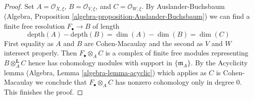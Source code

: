 \documentclass[10pt,a4paper]{amsart}
\theoremstyle{plain}
\theoremstyle{definition}
\theoremstyle{remark}
\numberwithin{equation}{subsection}
\begin{document}
\begin{proof}
Set $A = \mathcal{O}_{X, \xi}$, $B = \mathcal{O}_{V, \xi}$, and
$C = \mathcal{O}_{W, \xi}$. By Auslander-Buchsbaum
(Algebra, Proposition \ref{algebra-proposition-Auslander-Buchsbaum})
we can find a finite free resolution $F_\bullet \to B$ of
length
$$
\text{depth}(A) - \text{depth}(B) =
\dim(A) - \dim(B) = \dim(C)
$$
First equality as $A$ and $B$ are Cohen-Macaulay and the second
as $V$ and $W$ intersect properly. Then $F_\bullet \otimes_A C$ is a
complex of finite free modules representing $B \otimes_A^\mathbf{L} C$
hence has cohomology modules with support in $\{\mathfrak m_A\}$.
By the Acyclicity lemma (Algebra, Lemma \ref{algebra-lemma-acyclic})
which applies as $C$ is Cohen-Macaulay
we conclude that $F_\bullet \otimes_A C$ has nonzero
cohomology only in degree $0$. This finishes the proof.
\end{proof}
\end{document}
